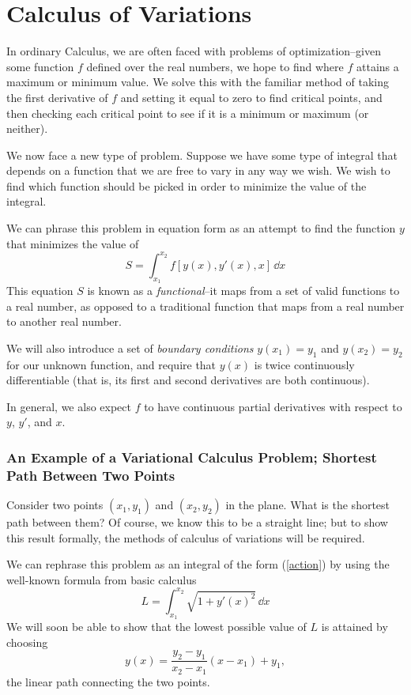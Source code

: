 \chapter{Calculus of Variations}
In ordinary Calculus, we are often faced with problems of optimization--given some function $f$ defined over the real numbers, we hope to find where $f$ attains a maximum or minimum value. We solve this with the familiar method of taking the first derivative of $f$ and setting it equal to zero to find critical points, and then checking each critical point to see if it is a minimum or maximum (or neither).

We now face a new type of problem. Suppose we have some type of integral that depends on a function that we are free to vary in any way we wish. We wish to find which function should be picked in order to minimize the value of the integral.

We can phrase this problem in equation form as an attempt to find the function $y$ that minimizes the value of
\begin{equation} \label{action}
    S = \int_{x_1}^{x_2} f[y(x), y'(x), x] \, \dd x
\end{equation}
This equation $S$ is known as a \textit{functional}--it maps from a set of valid functions to a real number, as opposed to a traditional function that maps from a real number to another real number. 

We will also introduce a set of \textit{boundary conditions} $y(x_1) = y_1$ and $y(x_2) = y_2$ for our unknown function, and require that $y(x)$ is twice continuously differentiable (that is, its first and second derivatives are both continuous). 

In general, we also expect $f$ to have continuous partial derivatives with respect to $y$, $y'$, and $x$. 

\subsection*{An Example of a Variational Calculus Problem; Shortest Path Between Two Points}
Consider two points $(x_1, y_1)$ and $(x_2, y_2)$ in the plane. What is the shortest path between them? Of course, we know this to be a straight line; but to show this result formally, the methods of calculus of variations will be required.

We can rephrase this problem as an integral of the form (\ref{action}) by using the well-known formula from basic calculus 
\[ L = \int_{x_1}^{x_2} \sqrt{1 + y'(x)^2}\, \dd x \]
We will soon be able to show that the lowest possible value of $L$ is attained by choosing
\[ y(x) = \frac{y_2 - y_1}{x_2 - x_1}(x - x_1) + y_1, \]
the linear path connecting the two points. 
